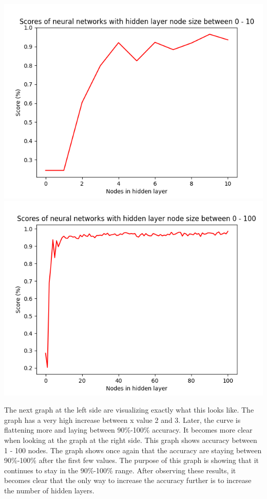 \documentclass[titlepage, 11pt]{article}
\begin{document}
    \begin{center}
        \includegraphics[scale=0.5]{Accuracy-1-10.png}
        \includegraphics[scale=0.5]{Accuracy-1-100.png}
    \end{center}The next graph at the left side are visualizing exactly what this looks like. The graph has a very high increase between x value 2 and 3. Later, the curve is flattening more and laying between 90\%-100\% accuracy.
    It becomes more clear when looking at the graph at the right side. This graph shows accuracy between 1 - 100 nodes. The graph shows once again that the accuracy are staying between 90\%-100\% after the first few values. The purpose of this graph is showing that it continues to stay in the 90\%-100\% range. After observing these results, it becomes clear that the only way to increase the accuracy further is to increase the number of hidden layers.
    \begin{center}
    \end{center}
\end{document}
